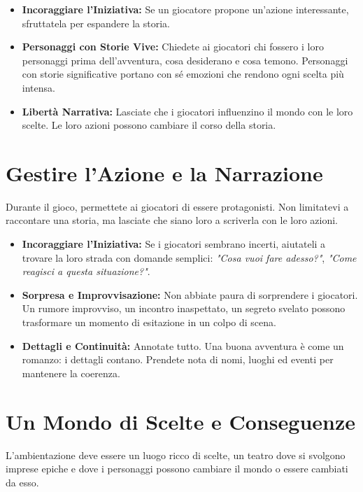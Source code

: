 \documentclass[../manuale_main.tex]{subfiles}
\begin{document}
\begin{itemize}
\item \textbf{Incoraggiare l'Iniziativa:} Se un giocatore propone un'azione interessante, sfruttatela per espandere la storia.
\item \textbf{Personaggi con Storie Vive:} Chiedete ai giocatori chi fossero i loro personaggi prima dell’avventura, cosa desiderano e cosa temono. Personaggi con storie significative portano con sé emozioni che rendono ogni scelta più intensa.
\item \textbf{Libertà Narrativa:} Lasciate che i giocatori influenzino il mondo con le loro scelte. Le loro azioni possono cambiare il corso della storia.
\end{itemize}

\vspace{0.3cm}

\section*{Gestire l'Azione e la Narrazione}
Durante il gioco, permettete ai giocatori di essere protagonisti. Non limitatevi a raccontare una storia, ma lasciate che siano loro a scriverla con le loro azioni.

\begin{itemize}
\item \textbf{Incoraggiare l'Iniziativa:} Se i giocatori sembrano incerti, aiutateli a trovare la loro strada con domande semplici: \textit{"Cosa vuoi fare adesso?"}, \textit{"Come reagisci a questa situazione?"}.
\item \textbf{Sorpresa e Improvvisazione:} Non abbiate paura di sorprendere i giocatori. Un rumore improvviso, un incontro inaspettato, un segreto svelato possono trasformare un momento di esitazione in un colpo di scena.
\item \textbf{Dettagli e Continuità:} Annotate tutto. Una buona avventura è come un romanzo: i dettagli contano. Prendete nota di nomi, luoghi ed eventi per mantenere la coerenza.
\end{itemize}

\vspace{0.3cm}

\section*{Un Mondo di Scelte e Conseguenze}
L'ambientazione deve essere un luogo ricco di scelte, un teatro dove si svolgono imprese epiche e dove i personaggi possono cambiare il mondo o essere cambiati da esso.
\end{document}

